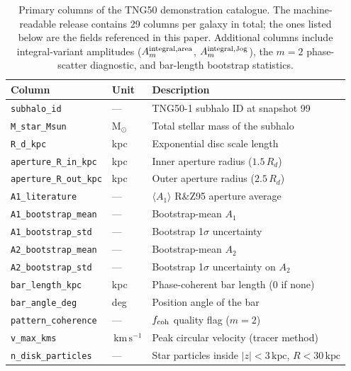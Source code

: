 \documentclass[fleqn,usenatbib]{mnras}
\newcommand{\Am}[1]{A_{#1}}
\newcommand{\Msun}{\mathrm{M}_{\odot}}
\newcommand{\kpc}{\,\mathrm{kpc}}
\newcommand{\kms}{\,\mathrm{km\,s^{-1}}}
\newcommand{\Amone}{\ensuremath{\Am{1}}}
\newcommand{\Amtwo}{\ensuremath{\Am{2}}}
\begin{document}
\begin{table}
  \centering
  \caption{Primary columns of the TNG50 demonstration catalogue.  The
    machine-readable release contains 29 columns per galaxy in total;
    the ones listed below are the fields referenced in this paper.
    Additional columns include integral-variant amplitudes
    ($A_m^{\rm integral,area}$, $A_m^{\rm integral,Jog}$), the
    $m=2$ phase-scatter diagnostic, and bar-length bootstrap
    statistics.}
  \label{tab:catalog_columns}
  \begin{tabular}{lll}
    \toprule
    Column & Unit & Description \\
    \midrule
    \texttt{subhalo\_id}          & ---     & TNG50-1 subhalo ID at snapshot 99 \\
    \texttt{M\_star\_Msun}        & $\Msun$ & Total stellar mass of the subhalo \\
    \texttt{R\_d\_kpc}            & kpc     & Exponential disc scale length \\
    \texttt{aperture\_R\_in\_kpc}  & kpc     & Inner aperture radius ($1.5\,R_d$) \\
    \texttt{aperture\_R\_out\_kpc} & kpc     & Outer aperture radius ($2.5\,R_d$) \\
    \texttt{A1\_literature}       & ---     & $\langle\Amone\rangle$ R\&Z95 aperture average \\
    \texttt{A1\_bootstrap\_mean}  & ---     & Bootstrap-mean $\Amone$ \\
    \texttt{A1\_bootstrap\_std}   & ---     & Bootstrap 1$\sigma$ uncertainty \\
    \texttt{A2\_bootstrap\_mean}  & ---     & Bootstrap-mean $\Amtwo$ \\
    \texttt{A2\_bootstrap\_std}   & ---     & Bootstrap 1$\sigma$ uncertainty on $\Amtwo$ \\
    \texttt{bar\_length\_kpc}     & kpc     & Phase-coherent bar length (0 if none) \\
    \texttt{bar\_angle\_deg}      & deg     & Position angle of the bar \\
    \texttt{pattern\_coherence}   & ---     & $f_{\rm coh}$ quality flag ($m=2$) \\
    \texttt{v\_max\_kms}          & $\kms$  & Peak circular velocity (tracer method) \\
    \texttt{n\_disk\_particles}   & ---     & Star particles inside $|z|<3\kpc$, $R<30\kpc$ \\
    \bottomrule
  \end{tabular}
\end{table}
\end{document}

